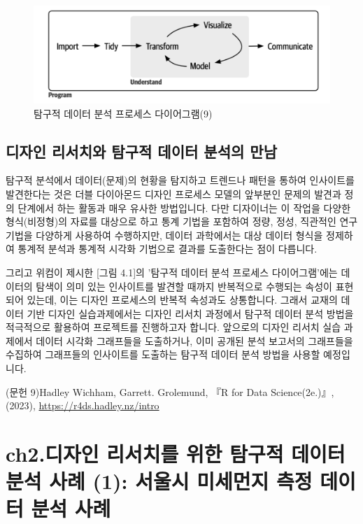 \documentclass[
  letterpaper,
]{book}
\begin{document}
\begin{figure}[H]

{\centering \includegraphics{img/fig3.png}

}

\caption{탐구적 데이터 분석 프로세스 다이어그램(9)}

\end{figure}%

\section{디자인 리서치와 탐구적 데이터 분석의
만남}\label{uxb514uxc790uxc778-uxb9acuxc11cuxce58uxc640-uxd0d0uxad6cuxc801-uxb370uxc774uxd130-uxbd84uxc11duxc758-uxb9ccuxb0a8}

탐구적 분석에서 데이터(문제)의 현황을 탐지하고 트렌드나 패턴을 통하여
인사이트를 발견한다는 것은 더블 다이아몬드 디자인 프로세스 모델의
앞부분인 문제의 발견과 정의 단계에서 하는 활동과 매우 유사한 방법입니다.
다만 디자이너는 이 작업을 다양한 형식(비정형)의 자료를 대상으로 하고
통계 기법을 포함하여 정량, 정성, 직관적인 연구 기법을 다양하게 사용하여
수행하지만, 데이터 과학에서는 대상 데이터 형식을 정제하여 통계적 분석과
통계적 시각화 기법으로 결과를 도출한다는 점이 다릅니다.

그리고 위컴이 제시한 {[}그림 4.1{]}의 '탐구적 데이터 분석 프로세스
다이어그램'에는 데이터의 탐색이 의미 있는 인사이트를 발견할 때까지
반복적으로 수행되는 속성이 표현되어 있는데, 이는 디자인 프로세스의
반복적 속성과도 상통합니다. 그래서 교재의 데이터 기반 디자인
실습과제에서는 디자인 리서치 과정에서 탐구적 데이터 분석 방법을
적극적으로 활용하여 프로젝트를 진행하고자 합니다. 앞으로의 디자인 리서치
실습 과제에서 데이터 시각화 그래프들을 도출하거나, 이미 공개된 분석
보고서의 그래프들을 수집하여 그래프들의 인사이트를 도출하는 탐구적
데이터 분석 방법을 사용할 예정입니다.

(문헌 9)Hadley Wichham, Garrett. Grolemund, 『R for Data Science(2e.)』,
(2023), \url{https://r4ds.hadley.nz/intro}

\chapter{ch2.디자인 리서치를 위한 탐구적 데이터 분석 사례 (1): 서울시
미세먼지 측정 데이터 분석
사례}\label{ch2.uxb514uxc790uxc778-uxb9acuxc11cuxce58uxb97c-uxc704uxd55c-uxd0d0uxad6cuxc801-uxb370uxc774uxd130-uxbd84uxc11d-uxc0acuxb840-1-uxc11cuxc6b8uxc2dc-uxbbf8uxc138uxba3cuxc9c0-uxce21uxc815-uxb370uxc774uxd130-uxbd84uxc11d-uxc0acuxb840}
\end{document}
